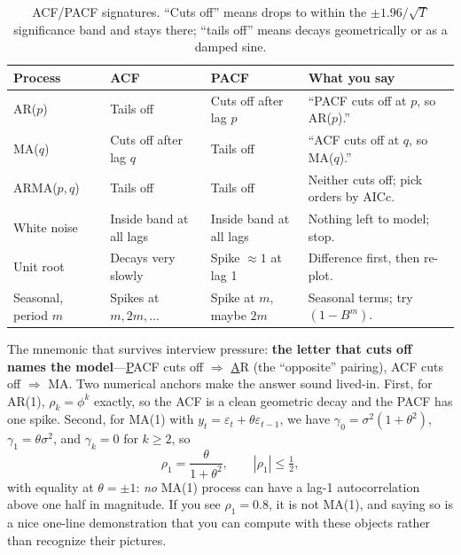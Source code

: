 \begin{table}[H]\centering
\caption{ACF/PACF signatures. ``Cuts off'' means drops to within the $\pm 1.96/\sqrt{T}$ significance band and stays there; ``tails off'' means decays geometrically or as a damped sine.}
\label{cml:tab:ts_acf_pacf}
\begin{tabularx}{\textwidth}{@{}>{\raggedright\arraybackslash}p{} >{\raggedright\arraybackslash}p{} >{\raggedright\arraybackslash}p{} X@{}}
\toprule
\textbf{Process} & \textbf{ACF} & \textbf{PACF} & \textbf{What you say} \\
\midrule
AR($p$) & Tails off & Cuts off after lag $p$ & ``PACF cuts off at $p$, so AR($p$).'' \\
MA($q$) & Cuts off after lag $q$ & Tails off & ``ACF cuts off at $q$, so MA($q$).'' \\
ARMA($p,q$) & Tails off & Tails off & Neither cuts off; pick orders by AICc. \\
White noise & Inside band at all lags & Inside band at all lags & Nothing left to model; stop. \\
Unit root & Decays very slowly & Spike $\approx 1$ at lag 1 & Difference first, then re-plot. \\
Seasonal, period $m$ & Spikes at $m, 2m, \ldots$ & Spike at $m$, maybe $2m$ & Seasonal terms; try $(1-B^m)$. \\
\bottomrule
\end{tabularx}
\end{table}

The mnemonic that survives interview pressure: \textbf{the letter that cuts off names the model}---\underline{P}ACF cuts off $\Rightarrow$ \underline{A}R (the ``opposite'' pairing), ACF cuts off $\Rightarrow$ MA. Two numerical anchors make the answer sound lived-in. First, for AR(1), $\rho_k = \phi^k$ exactly, so the ACF is a clean geometric decay and the PACF has one spike. Second, for MA(1) with $y_t = \varepsilon_t + \theta\varepsilon_{t-1}$, we have $\gamma_0 = \sigma^2(1+\theta^2)$, $\gamma_1 = \theta\sigma^2$, and $\gamma_k = 0$ for $k \ge 2$, so
\begin{equation}
\rho_1 = \frac{\theta}{1+\theta^2}, \qquad |\rho_1| \le \tfrac{1}{2},
\end{equation}
with equality at $\theta = \pm 1$: \emph{no} MA(1) process can have a lag-1 autocorrelation above one half in magnitude. If you see $\rho_1 = 0.8$, it is not MA(1), and saying so is a nice one-line demonstration that you can compute with these objects rather than recognize their pictures.

